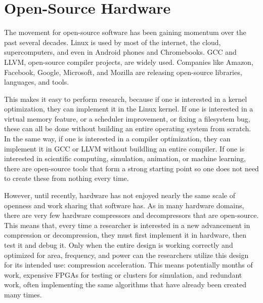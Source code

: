 \documentclass[doublespace,nopageskip]{VTthesis}
\begin{document}
\section{Open-Source Hardware}\label{se:open-source_motivation}
The movement for open-source software has been gaining momentum over the past several decades. Linux is used by most of the internet, the cloud, supercomputers, and even in Android phones and Chromebooks. GCC and LLVM, open-source compiler projects, are widely used. Companies like Amazon, Facebook, Google, Microsoft, and Mozilla are releasing open-source libraries, languages, and tools.

This makes it easy to perform research, because if one is interested in a kernel optimization, they can implement it in the Linux kernel. If one is interested in a virtual memory feature, or a scheduler improvement, or fixing a filesystem bug, these can all be done without building an entire operating system from scratch. In the same way, if one is interested in a compiler optimization, they can implement it in GCC or LLVM without buildling an entire compiler. If one is interested in scientific computing, simulation, animation, or machine learning, there are open-source tools that form a strong starting point so one does not need to create these from nothing every time.

However, until recently, hardware has not enjoyed nearly the same scale of openness and work sharing that software has. As in many hardware domains, there are very few hardware compressors and decompressors that are open-source. This means that, every time a researcher is interested in a new advancement in compression or decompression, they must first implement it in hardware, then test it and debug it. Only when the entire design is working correctly and optimized for area, frequency, and power can the researchers utilize this design for its intended use: compression acceleration. This means potentially months of work, expensive FPGAs for testing or clusters for simulation, and redundant work, often implementing the same algorithms that have already been created many times.
\end{document}
